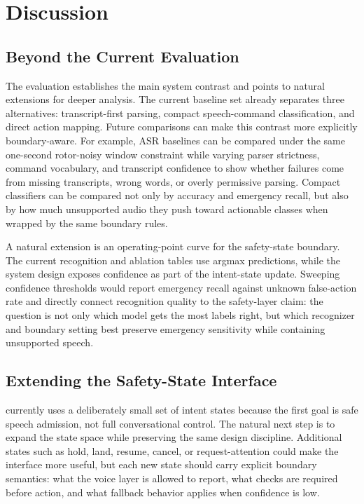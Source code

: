 \section{Discussion}
\label{sec:discussion}

\subsection{Beyond the Current Evaluation}

The evaluation establishes the main system contrast and points to natural extensions for deeper analysis. The current baseline set already separates three alternatives: transcript-first parsing, compact speech-command classification, and direct action mapping. Future comparisons can make this contrast more explicitly boundary-aware. For example, ASR baselines can be compared under the same one-second rotor-noisy window constraint while varying parser strictness, command vocabulary, and transcript confidence to show whether failures come from missing transcripts, wrong words, or overly permissive parsing. Compact classifiers can be compared not only by accuracy and emergency recall, but also by how much unsupported audio they push toward actionable classes when wrapped by the same boundary rules.

A natural extension is an operating-point curve for the safety-state boundary. The current recognition and ablation tables use argmax predictions, while the system design exposes confidence as part of the intent-state update. Sweeping confidence thresholds would report emergency recall against unknown false-action rate and directly connect recognition quality to the safety-layer claim: the question is not only which model gets the most labels right, but which recognizer and boundary setting best preserve emergency sensitivity while containing unsupported speech.

\subsection{Extending the Safety-State Interface}

\sys{} currently uses a deliberately small set of intent states because the first goal is safe speech admission, not full conversational control. The natural next step is to expand the state space while preserving the same design discipline. Additional states such as hold, land, resume, cancel, or request-attention could make the interface more useful, but each new state should carry explicit boundary semantics: what the voice layer is allowed to report, what checks are required before action, and what fallback behavior applies when confidence is low.

